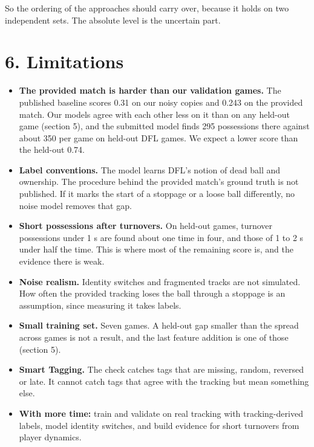 \documentclass[10pt,a4paper]{article}
\begin{document}
So the ordering of the approaches should carry over, because it holds on two independent sets.
The absolute level is the uncertain part.


\section*{6. Limitations}


\begin{itemize}\setlength{\itemsep}{2pt}

\item \textbf{The provided match is harder than our validation games.} The published baseline scores
  0.31 on our noisy copies and 0.243 on the provided match. Our models agree with each other
  less on it than on any held-out game (section 5), and the submitted model finds 295
  possessions there against about 350 per game on held-out DFL games. We expect a lower score
  than the held-out 0.74.

\item \textbf{Label conventions.} The model learns DFL's notion of dead ball and ownership. The procedure
  behind the provided match's ground truth is not published. If it marks the start of a
  stoppage or a loose ball differently, no noise model removes that gap.

\item \textbf{Short possessions after turnovers.} On held-out games, turnover possessions under 1 s are
  found about one time in four, and those of 1 to 2 s under half the time. This is where most of
  the remaining score is, and the evidence there is weak.

\item \textbf{Noise realism.} Identity switches and fragmented tracks are not simulated. How often the
  provided tracking loses the ball through a stoppage is an assumption, since measuring it
  takes labels.

\item \textbf{Small training set.} Seven games. A held-out gap smaller than the spread across games is
  not a result, and the last feature addition is one of those (section 5).

\item \textbf{Smart Tagging.} The check catches tags that are missing, random, reversed or late. It
  cannot catch tags that agree with the tracking but mean something else.

\item \textbf{With more time:} train and validate on real tracking with tracking-derived labels, model
  identity switches, and build evidence for short turnovers from player dynamics.

\end{itemize}
\end{document}
